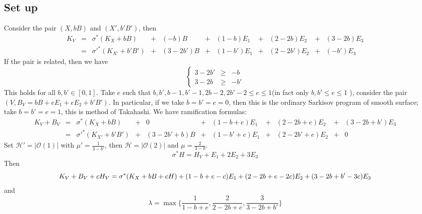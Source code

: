 \documentclass{article}
\begin{document}
\subsection{Set up}
Consider the pair $ (X,bB) $ and $ (X',b'B') $, then 
$$ \begin{array}{rcccccccccc}
  K_V&=&\sigma^*(K_X+bB)&+&(-b)B&+&(1-b)E_1&+&(2-2b)E_2&+&(3-2b)E_3\\
  &=&\sigma'^*(K_{X'}+b'B')&+&(3-2b')B&+&(1-b')E_1&+&(2-2b')E_2&+&(-b')E_3
\end{array} $$
If the pair is related, then we have 
$$ \left\{\begin{array}{lcl}
  3-2b'&\geqslant&-b\\
  3-2b&\geqslant&-b'
  \end{array} \right.$$
This holds for all $ b,b'\in [0,1] $. Take $ e $ such that $ b,b',b-1,b'-1,2b-2,2b'-2\leqslant e\leqslant 1 $(in fact only $ b,b'\leqslant e\leqslant 1 $ ), consider the pair $ (V,B_V=bB+eE_1+eE_2+b'B') $.
In particular, if we take $ b=b'=e=0 $, then this is the ordinary Sarkisov program of smooth surface; take $ b=b'=e=1 $, this is method of Takahashi. We have ramification formulas:
$$ \begin{array}{rcccccccccc}
  K_V+B_V&=&\sigma^*(K_X+bB)&+&0&+&(1-b+e)E_1&+&(2-2b+e)E_2&+&(3-2b+b')E_3\\
  &=&\sigma'^*(K_{X'}+b'B')&+&(3-2b'+b)B&+&(1-b'+e)E_1&+&(2-2b'+e)E_2&+&0
\end{array} $$
Set $ \mathcal{H}'=|\mathcal{O}(1)| $ with $ \mu'= \frac{1}{3-b'}$, then $ \mathcal{H}=|\mathcal{O}(2)| $ and $ \mu=\frac{2}{3-b} $.
$$ \sigma^*H=H_V+E_1+2E_2+3E_3 $$
Then
$$ K_V+B_V+cH_V=\sigma^*(K_X+bB+cH)+(1-b+e-c)E_1+(2-2b+e-2c)E_2+(3-2b+b'-3c)E_3\\ $$
and 
$$ \lambda=\max\{ \frac{1}{1-b+e},\frac{2}{2-2b+e},\frac{3}{3-2b+b'}\} $$
\end{document}

